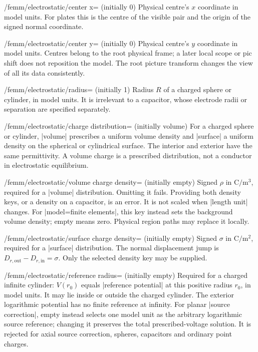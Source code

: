 \begin{key}{/femm/electrostatic/center x= (initially 0)}
Physical centre's $x$ coordinate in model units. For plates this is the centre
of the visible pair and the origin of the signed normal coordinate.
\end{key}
\begin{key}{/femm/electrostatic/center y= (initially 0)}
Physical centre's $y$ coordinate in model units. Centres belong to the root
physical frame; a later local scope or pic shift does not reposition the model.
The root picture transform changes the view of all its data consistently.
\end{key}
\begin{key}{/femm/electrostatic/radius= (initially 1)}
Radius $R$ of a charged sphere or cylinder, in model units. It is irrelevant
to a capacitor, whose electrode radii or separation are specified separately.
\end{key}
\begin{key}{/femm/electrostatic/charge distribution= (initially volume)}
For a charged sphere or cylinder, |volume| prescribes a uniform volume density
and |surface| a uniform density on the spherical or cylindrical surface.
The interior and exterior have the same permittivity. A volume charge is a
prescribed distribution, not a conductor in electrostatic equilibrium.
\end{key}
\begin{key}{/femm/electrostatic/volume charge density= (initially \normalfont empty)}
Signed $\rho$ in $\mathrm{C/m^3}$, required for a |volume| distribution.
Omitting it fails. Providing both density keys, or a density on a capacitor,
is an error. It is not scaled when |length unit| changes.
For |model=finite elements|, this key instead sets the background volume density;
empty means zero. Physical region paths may replace it locally.
\end{key}
\begin{key}{/femm/electrostatic/surface charge density= (initially \normalfont empty)}
Signed $\sigma$ in $\mathrm{C/m^2}$, required for a |surface| distribution.
The normal displacement jump is $D_{r,\mathrm{out}}-D_{r,\mathrm{in}}=\sigma$.
Only the selected density key may be supplied.
\end{key}
\begin{key}{/femm/electrostatic/reference radius= (initially \normalfont empty)}
Required for a charged infinite cylinder: $V(r_0)$ equals |reference potential|
at this positive radius $r_0$, in model units. It may lie inside or outside the
charged cylinder. The exterior logarithmic potential has no finite reference
at infinity. For planar |source correction|, empty instead selects one model
unit as the arbitrary logarithmic source reference; changing it preserves
the total prescribed-voltage solution. It is rejected for axial source
correction, spheres, capacitors and ordinary point charges.
\end{key}
